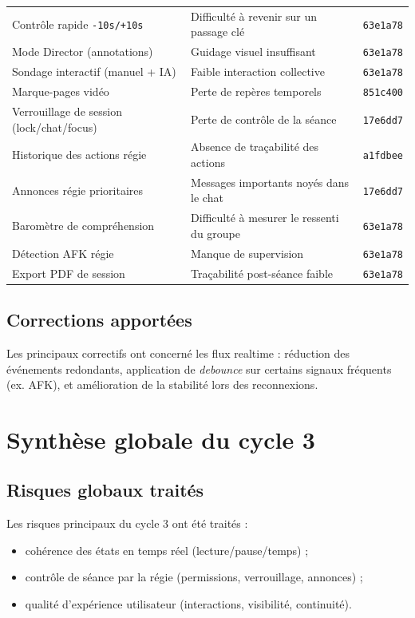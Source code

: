 \documentclass[11pt,a4paper]{report}
\begin{document}
\begin{longtable}{L{0.36\textwidth} L{0.34\textwidth} C{0.20\textwidth}}
Contrôle rapide \texttt{-10s/+10s} & Difficulté à revenir sur un passage clé & \texttt{63e1a78} \\
Mode Director (annotations) & Guidage visuel insuffisant & \texttt{63e1a78} \\
Sondage interactif (manuel + IA) & Faible interaction collective & \texttt{63e1a78} \\
Marque-pages vidéo & Perte de repères temporels & \texttt{851c400} \\
Verrouillage de session (lock/chat/focus) & Perte de contrôle de la séance & \texttt{17e6dd7} \\
Historique des actions régie & Absence de traçabilité des actions & \texttt{a1fdbee} \\
Annonces régie prioritaires & Messages importants noyés dans le chat & \texttt{17e6dd7} \\
Baromètre de compréhension & Difficulté à mesurer le ressenti du groupe & \texttt{63e1a78} \\
Détection AFK régie & Manque de supervision & \texttt{63e1a78} \\
Export PDF de session & Traçabilité post-séance faible & \texttt{63e1a78} \\
\bottomrule
\end{longtable}
\normalsize

\section{Corrections apportées}
Les principaux correctifs ont concerné les flux realtime : réduction des événements redondants, application de \textit{debounce} sur certains signaux fréquents (ex. AFK), et amélioration de la stabilité lors des reconnexions.

\chapter{Synthèse globale du cycle 3}

\section{Risques globaux traités}
Les risques principaux du cycle 3 ont été traités :
\begin{itemize}
    \item cohérence des états en temps réel (lecture/pause/temps) ;
    \item contrôle de séance par la régie (permissions, verrouillage, annonces) ;
    \item qualité d'expérience utilisateur (interactions, visibilité, continuité).
\end{itemize}
\end{document}

